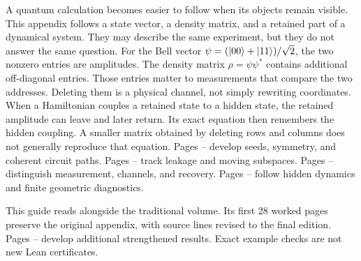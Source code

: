 \begingroup

\fontsize{10.5}{12.6}\selectfont
\setlength{\parskip}{4pt}
\setlength{\abovedisplayskip}{6pt}\setlength{\belowdisplayskip}{6pt}
A quantum calculation becomes easier to follow when its objects remain visible. This appendix follows a state vector, a density matrix, and a retained part of a dynamical system. They may describe the same experiment, but they do not answer the same question.
For the Bell vector $\psi=(\lvert 00\rangle+\lvert 11\rangle)/\sqrt2$, the two nonzero entries are amplitudes. The density matrix $\rho=\psi\psi^*$ contains additional off-diagonal entries. Those entries matter to measurements that compare the two addresses. Deleting them is a physical channel, not simply rewriting coordinates.
When a Hamiltonian couples a retained state to a hidden state, the retained amplitude can leave and later return. Its exact equation then remembers the hidden coupling. A smaller matrix obtained by deleting rows and columns does not generally reproduce that equation.
Pages -- develop seeds, symmetry, and coherent circuit paths. Pages -- track leakage and moving subspaces. Pages -- distinguish measurement, channels, and recovery. Pages -- follow hidden dynamics and finite geometric diagnostics.

This guide reads alongside the traditional volume. Its first 28 worked pages preserve the original appendix, with source lines revised to the final edition. Pages -- develop additional strengthened results. Exact example checks are not new Lean certificates.

